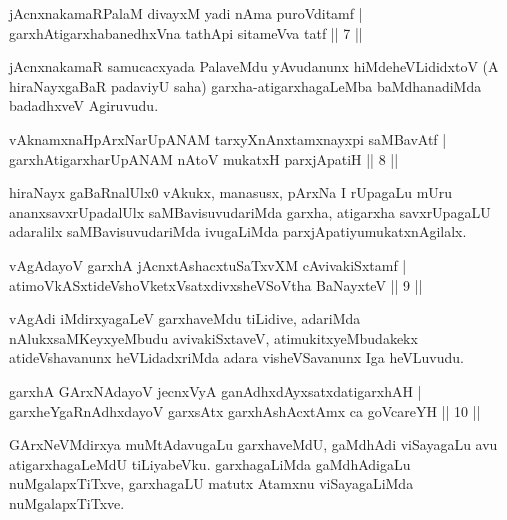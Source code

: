
\begin{shl}
jAcnxnakamaRPalaM divayxM yadi nAma puroVditamf |\\
garxhAtigarxhabanedhxVna tathA\s pi sitameVva tatf \hfill || 7 || 
\end{shl}

\begin{artha}
jAcnxnakamaR samucacxyada PalaveMdu yAvudanunx hiMde\break heVLididxtoV (A hiraNayxgaBaR padaviyU saha) garxha-atigarxhagaLeMba baMdhanadiMda badadhxveV Agiruvudu.
\end{artha}

\begin{shl}
vAknamxnaHpArxNarUpANAM tarxyXnAnxtamxnayxpi saMBavAtf |\\
garxhAtigarxharUpANAM nAtoV mukatxH parxjApatiH \hfill || 8 ||
\end{shl}

\begin{artha}
hiraNayx gaBaRnalUlx0 vAkukx, manasusx, pArxNa I rUpagaLu mUru ananxsavxrUpa\-dalUlx saMBavisuvudariMda garxha, atigarxha savxrUpagaLU adaralilx saMBavisuvudariMda ivugaLiMda parxjApatiyu\break mukatxnAgilalx.
\end{artha}

\begin{shl}
vAgAdayoV garxhA jAcnxtAshacxtuSaTxvXM cAvivakiSxtamf |\\
atimoVkASxtideVshoVketxVsatxdivxsheVSoV\s tha BaNayxteV \hfill || 9 ||
\end{shl}

\begin{artha}
vAgAdi iMdirxyagaLeV garxhaveMdu tiLidive, adariMda nAlukx\break saMKeyxyeMbudu avivakiSxtaveV, atimukitxyeMbudakekx atideVshavanunx heVLidadxriMda adara visheVSavanunx Iga heVLuvudu.
\end{artha}

\begin{shl}
garxhA GArxNAdayoV jecnxVyA ganAdhxdAyxsatxdatigarxhAH |\\
garxheYgaRnAdhxdayoV garxsAtx garxhAshAcx\s \s tAmx ca goVcareYH \hfill || 10 ||
\end{shl}

\begin{artha}
GArxNeVMdirxya muMtAdavugaLu garxhaveMdU, gaMdhAdi viSayagaLu avu atigarxhagaLeMdU tiLiyabeVku. garxhagaLiMda gaMdhAdigaLu nuMgalapxTiTxve, garxhagaLU matutx Atamxnu viSayagaLiMda nuMgalapxTiTxve.
\end{artha}

